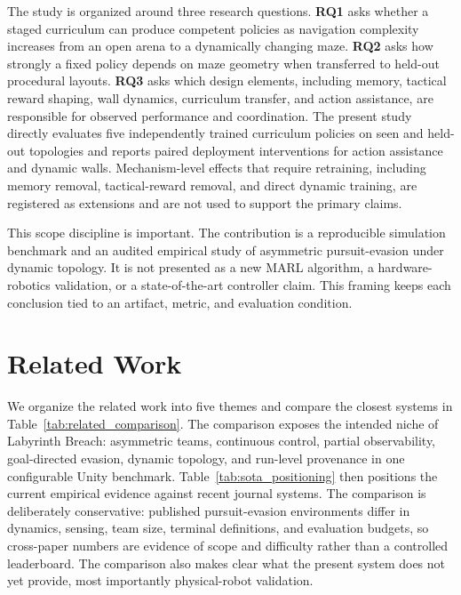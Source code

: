 \documentclass[journal]{IEEEtran}
\begin{document}
The study is organized around three research questions. \textbf{RQ1} asks whether a staged curriculum can produce competent policies as navigation complexity increases from an open arena to a dynamically changing maze. \textbf{RQ2} asks how strongly a fixed policy depends on maze geometry when transferred to held-out procedural layouts. \textbf{RQ3} asks which design elements, including memory, tactical reward shaping, wall dynamics, curriculum transfer, and action assistance, are responsible for observed performance and coordination. The present study directly evaluates five independently trained curriculum policies on seen and held-out topologies and reports paired deployment interventions for action assistance and dynamic walls. Mechanism-level effects that require retraining, including memory removal, tactical-reward removal, and direct dynamic training, are registered as extensions and are not used to support the primary claims.

This scope discipline is important. The contribution is a reproducible simulation benchmark and an audited empirical study of asymmetric pursuit-evasion under dynamic topology. It is not presented as a new MARL algorithm, a hardware-robotics validation, or a state-of-the-art controller claim. This framing keeps each conclusion tied to an artifact, metric, and evaluation condition.

\section{Related Work}

We organize the related work into five themes and compare the closest systems in Table~\ref{tab:related_comparison}. The comparison exposes the intended niche of Labyrinth Breach: asymmetric teams, continuous control, partial observability, goal-directed evasion, dynamic topology, and run-level provenance in one configurable Unity benchmark. Table~\ref{tab:sota_positioning} then positions the current empirical evidence against recent journal systems. The comparison is deliberately conservative: published pursuit-evasion environments differ in dynamics, sensing, team size, terminal definitions, and evaluation budgets, so cross-paper numbers are evidence of scope and difficulty rather than a controlled leaderboard. The comparison also makes clear what the present system does not yet provide, most importantly physical-robot validation.
\end{document}

